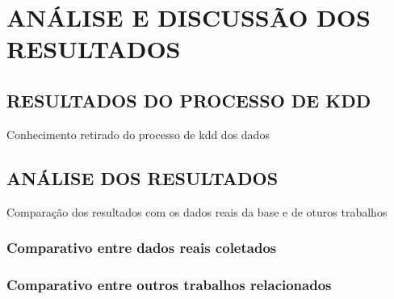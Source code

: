 
\chapter{ANÁLISE E DISCUSSÃO DOS RESULTADOS}
\label{chap:resutlados}

\section{RESULTADOS DO PROCESSO DE KDD}
\label{sec:resultadosRegressao}
Conhecimento retirado do processo de kdd dos dados

\section{ANÁLISE DOS RESULTADOS}
\label{sec:analiseResultados}
Comparação dos resultados com os dados reais da base e de oturos trabalhos

\subsection{Comparativo entre dados reais coletados}
\label{subesction:compDadosReais}

\subsection{Comparativo entre outros trabalhos relacionados}
\label{subsection:compOutrosTrabalhos}